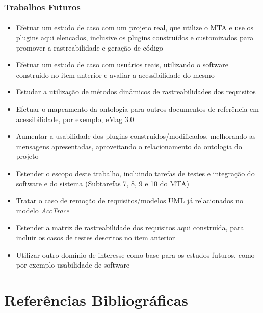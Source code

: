 \documentclass{beamer}
\begin{document}
 \begin{frame}[allowframebreaks]
 \frametitle{Trabalhos Futuros}
 \framesubtitle{}
 
 \begin{itemize}
  \item Efetuar um estudo de caso com um projeto real, que utilize o MTA e use os plugins
 aqui elencados, inclusive os plugins construídos e customizados para promover a rastreabilidade e geração de código
   \item Efetuar um estudo de caso com usuários reais, utilizando o software construido no item anterior e avaliar a acessibilidade do mesmo
   \item Estudar a utilização de métodos dinâmicos de rastreabilidades dos requisitos
   \item Efetuar o mapeamento da ontologia para outros documentos de referência em acessibilidade, por exemplo, eMag 3.0
   \item Aumentar a usabilidade dos plugins construídos/modificados, melhorando as mensagens apresentadas, aproveitando o relacionamento da ontologia do projeto
   \item Estender o escopo deste trabalho, incluindo tarefas de testes e integração do software e do sistema (Subtarefas 7, 8, 9 e 10 do MTA)
   \item Tratar o caso de remoção de requisitos/modelos UML já relacionados no modelo \textit{AccTrace}
   \item Estender a matriz de rastreabilidade dos requisitos aqui construída, para incluir os casos de testes descritos no item anterior
   \item Utilizar outro domínio de interesse como base para os estudos futuros, como por exemplo usabilidade de software 

\end{itemize}
\end{frame}

\section{Referências Bibliográficas}

\begin{frame}[allowframebreaks]





\end{frame}
\end{document}

